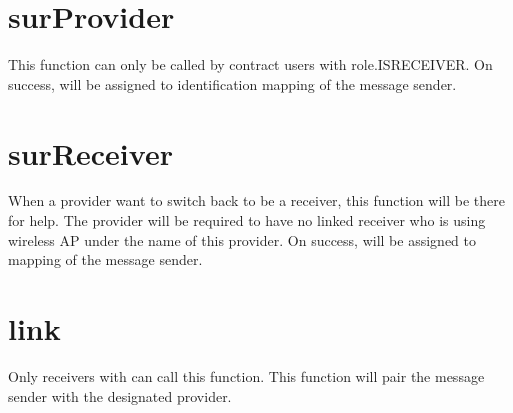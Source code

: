 \documentclass[letterpaper,10pt,english]{sphinxmanual}
\begin{document}
\section{surProvider}
\label{\detokenize{index:surprovider}}
%
\begin{sphinxVerbatim}[commandchars=\\\{\}]
     
\end{sphinxVerbatim}

This function can only be called by contract users with {\hyperref[\detokenize{index:identification}]{}} role.ISRECEIVER.
On success,  will be assigned to identification mapping of the message sender.


\section{surReceiver}
\label{\detokenize{index:surreceiver}}
%
\begin{sphinxVerbatim}[commandchars=\\\{\}]
   
\end{sphinxVerbatim}

When a provider want to switch back to be a receiver, this function will be there for help.
The provider will be required to have no linked receiver who is using wireless AP under the name of this provider.
On success,  will be assigned to {\hyperref[\detokenize{index:identification}]{}} mapping of the message sender.


\section{link}
\label{\detokenize{index:link}}
%
\begin{sphinxVerbatim}[commandchars=\\\{\}]
   
\end{sphinxVerbatim}

Only receivers with  can call this function.
This function will pair the message sender with the designated provider.
\end{document}
